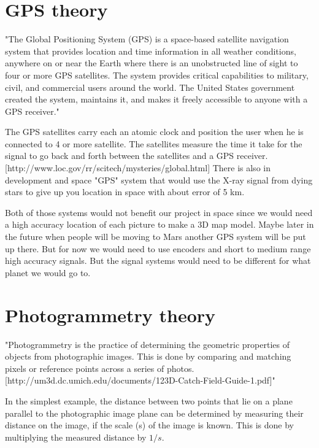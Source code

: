 \section{GPS theory}

"The Global Positioning System (GPS) is a space-based satellite navigation system that provides location and time information in all weather conditions, anywhere on or near the Earth where there is an unobstructed line of sight to four or more GPS satellites. The system provides critical capabilities to military, civil, and commercial users around the world. The United States government created the system, maintains it, and makes it freely accessible to anyone with a GPS receiver."%

The GPS satellites carry each an atomic clock and position the user when he is connected to 4 or more satellite. The satellites measure the time it take for the signal to go back and forth between the satellites and a GPS receiver.[http://www.loc.gov/rr/scitech/mysteries/global.html] There is also in development and space "GPS" system that would use the X-ray signal from dying stars to give up you location in space with about error of 5 km.%

Both of those systems would not benefit our project in space since we would need a high accuracy location of each picture to make a 3D map model. Maybe later in the future when people will be moving to Mars another GPS system will be put up there. But for now we would need to use encoders and short to medium range high accuracy signals. But the signal systems would need to be different for what planet we would go to. 

\section{Photogrammetry theory}

"Photogrammetry is the practice of determining the geometric properties of objects from
photographic images. This is done by comparing and matching pixels or reference points across a series
of photos.[http://um3d.dc.umich.edu/documents/123D-Catch-Field-Guide-1.pdf]"


In the simplest example, the distance between two points that lie on a plane parallel to the photographic image plane can be determined by measuring their distance on the image, if the scale (s) of the image is known. This is done by multiplying the measured distance by $1/s$.%

